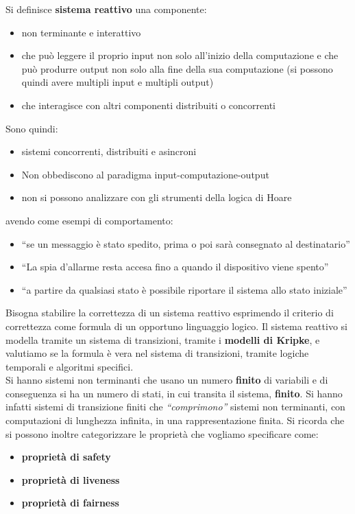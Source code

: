 \begin{definizione}
  Si definisce \textbf{sistema reattivo} una componente:
  \begin{itemize}
    \item non terminante e interattivo
    \item che può leggere il proprio input non solo all'inizio della
    computazione e che può produrre output non solo alla fine della sua
    computazione (si possono quindi avere multipli input e multipli output)
    \item che interagisce con altri componenti distribuiti o concorrenti
  \end{itemize}
  Sono quindi:
  \begin{itemize}
    \item sistemi concorrenti, distribuiti e asincroni
    \item Non obbediscono al paradigma input-computazione-output
    \item non si possono analizzare con gli strumenti della logica di Hoare
  \end{itemize}
  avendo come esempi di comportamento:
  \begin{itemize}
    \item ``se un messaggio è stato spedito, prima o poi sarà consegnato al
    destinatario''
    \item ``La spia d’allarme resta accesa fino a quando il dispositivo viene
    spento'' 
    \item ``a partire da qualsiasi stato è possibile riportare il sistema allo
    stato iniziale''
  \end{itemize}
\end{definizione}
Bisogna stabilire la correttezza di un sistema reattivo esprimendo il criterio
di correttezza come formula di un opportuno linguaggio logico. Il sistema
reattivo si modella tramite un sistema di transizioni, tramite i \textbf{modelli
di Kripke}, e valutiamo se la formula è vera nel sistema di transizioni, tramite
logiche temporali e algoritmi specifici.\\
Si hanno sistemi non terminanti che usano un numero \textbf{finito} di
variabili e di conseguenza si ha un numero di stati, in cui transita il sistema,
\textbf{finito}. Si hanno infatti sistemi di transizione finiti che
\textit{``comprimono''} sistemi non terminanti, con computazioni di lunghezza
infinita, in una rappresentazione finita.
Si ricorda che si possono inoltre categorizzare le proprietà che vogliamo
specificare come: 
\begin{itemize}
  \item \textbf{proprietà di safety}
  \item \textbf{proprietà di liveness}
  \item \textbf{proprietà di fairness}
\end{itemize}
